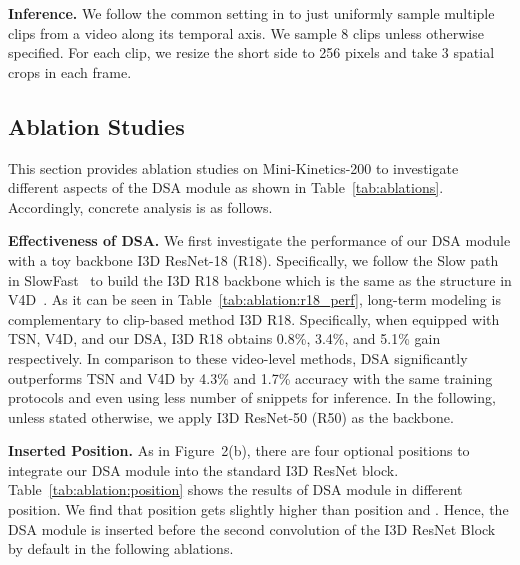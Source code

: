 \documentclass[sigconf]{acmart}
\newcommand{\RNum}[1]{\uppercase\expandafter{\romannumeral #1\relax}}
\begin{document}
\textbf{Inference.} 
We follow the common setting in \cite{slowfast} to just uniformly sample multiple clips from a video along its temporal axis. We sample 8 clips unless otherwise specified. For each clip, we resize the short side to 256 pixels and take 3 spatial crops in each frame.


\subsection{Ablation Studies}
\label{sec:ab}
This section provides ablation studies on Mini-Kinetics-200 to investigate different aspects of the DSA module as shown in Table~\ref{tab:ablations}. Accordingly, concrete analysis is as follows.

\textbf{Effectiveness of DSA.} 
 We first investigate the performance of our DSA module with a toy backbone I3D ResNet-18 (R18). Specifically, we follow the Slow path in SlowFast~\cite{slowfast} to build the I3D R18 backbone which is the same as the structure in V4D~\cite{zhang2020v4d}. As it can be seen in Table~\ref{tab:ablation:r18_perf}, long-term modeling is complementary to clip-based method I3D R18. Specifically, when equipped with TSN, V4D, and our DSA, I3D R18 obtains 0.8\%, 3.4\%, and 5.1\% gain respectively. In comparison to these video-level methods, DSA significantly outperforms TSN and V4D by 4.3\% and 1.7\% accuracy with the same training protocols and even using less number of snippets for inference. In the following, unless stated otherwise, we apply I3D ResNet-50 (R50) as the backbone. 


\textbf{Inserted Position.}
As in Figure~2(b), there are four optional positions to integrate our DSA module into the standard I3D ResNet block. Table~\ref{tab:ablation:position} shows the results of DSA module in different position. We find that position \RNum{2} gets slightly higher than position \RNum{1} and \RNum{4}. Hence, the DSA module is inserted before the second convolution of the I3D ResNet Block by default in the following ablations.
\end{document}
